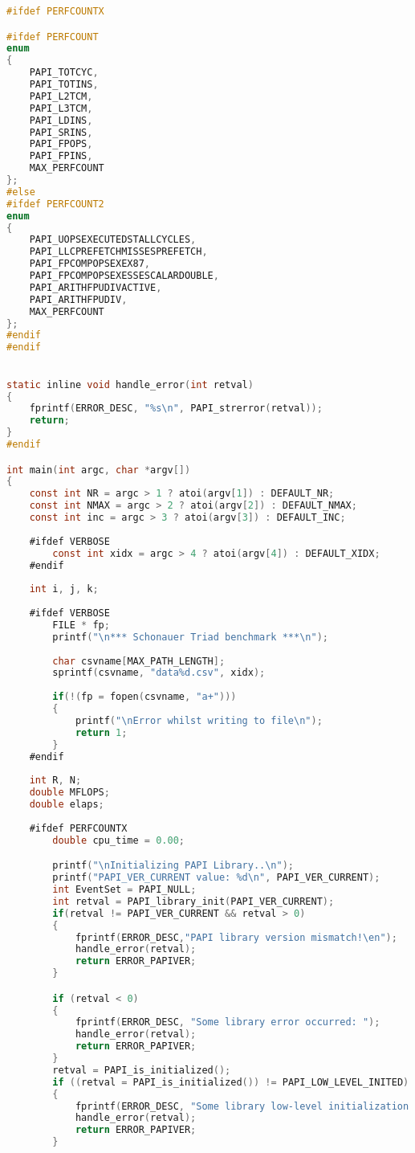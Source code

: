 \begin{lstlisting}[language=C,breaklines=true]
#ifdef PERFCOUNTX

#ifdef PERFCOUNT
enum
{
	PAPI_TOTCYC,
	PAPI_TOTINS,
	PAPI_L2TCM,
	PAPI_L3TCM,
	PAPI_LDINS,
	PAPI_SRINS,
	PAPI_FPOPS,
	PAPI_FPINS,
	MAX_PERFCOUNT
};
#else
#ifdef PERFCOUNT2
enum
{
	PAPI_UOPSEXECUTEDSTALLCYCLES,
	PAPI_LLCPREFETCHMISSESPREFETCH,
	PAPI_FPCOMPOPSEXEX87,
	PAPI_FPCOMPOPSEXESSESCALARDOUBLE,
	PAPI_ARITHFPUDIVACTIVE,
	PAPI_ARITHFPUDIV,
	MAX_PERFCOUNT
};
#endif 
#endif
	

static inline void handle_error(int retval)
{
	fprintf(ERROR_DESC, "%s\n", PAPI_strerror(retval));
	return;
}
#endif

int main(int argc, char *argv[])
{
	const int NR = argc > 1 ? atoi(argv[1]) : DEFAULT_NR;
	const int NMAX = argc > 2 ? atoi(argv[2]) : DEFAULT_NMAX;
	const int inc = argc > 3 ? atoi(argv[3]) : DEFAULT_INC;
	
	#ifdef VERBOSE
		const int xidx = argc > 4 ? atoi(argv[4]) : DEFAULT_XIDX;
	#endif
	
	int i, j, k;
	
	#ifdef VERBOSE
		FILE * fp;
		printf("\n*** Schonauer Triad benchmark ***\n");
	
		char csvname[MAX_PATH_LENGTH];
	  	sprintf(csvname, "data%d.csv", xidx);
	
		if(!(fp = fopen(csvname, "a+")))
		{
			printf("\nError whilst writing to file\n");
			return 1;
		}
	#endif
	
	int R, N;
	double MFLOPS;
	double elaps;
	
	#ifdef PERFCOUNTX
		double cpu_time = 0.00;

		printf("\nInitializing PAPI Library..\n");
		printf("PAPI_VER_CURRENT value: %d\n", PAPI_VER_CURRENT);
		int EventSet = PAPI_NULL;
		int retval = PAPI_library_init(PAPI_VER_CURRENT);
		if(retval != PAPI_VER_CURRENT && retval > 0)
		{
			fprintf(ERROR_DESC,"PAPI library version mismatch!\en");
			handle_error(retval);			
			return ERROR_PAPIVER;
		}

		if (retval < 0)
		{
			fprintf(ERROR_DESC, "Some library error occurred: ");
			handle_error(retval);
			return ERROR_PAPIVER;
		}
		retval = PAPI_is_initialized();
		if ((retval = PAPI_is_initialized()) != PAPI_LOW_LEVEL_INITED)
		{
			fprintf(ERROR_DESC, "Some library low-level initialization error occurred: ");
			handle_error(retval);
			return ERROR_PAPIVER;
		}		


\end{lstlisting}
